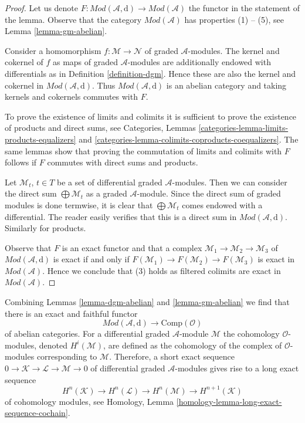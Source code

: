 \begin{proof}
Let us denote
$F : \textit{Mod}(\mathcal{A}, \text{d}) \to \textit{Mod}(\mathcal{A})$
the functor in the statement of the lemma. Observe that
the category $\textit{Mod}(\mathcal{A})$ has properties (1) -- (5), see
Lemma \ref{lemma-gm-abelian}.

\medskip\noindent
Consider a homomorphism $f : \mathcal{M} \to \mathcal{N}$
of graded $\mathcal{A}$-modules. The kernel
and cokernel of $f$ as maps of graded $\mathcal{A}$-modules
are additionally endowed with differentials as in
Definition \ref{definition-dgm}. Hence these are also
the kernel and cokernel in $\textit{Mod}(\mathcal{A}, \text{d})$.
Thus $\textit{Mod}(\mathcal{A}, \text{d})$ is an abelian category
and taking kernels and cokernels commutes with $F$.

\medskip\noindent
To prove the existence of limits and colimits it is sufficient
to prove the existence of products and direct sums, see
Categories, Lemmas \ref{categories-lemma-limits-products-equalizers} and
\ref{categories-lemma-colimits-coproducts-coequalizers}.
The same lemmas show that
proving the commutation of limits and colimits with $F$
follows if $F$ commutes with direct sums and products.

\medskip\noindent
Let $\mathcal{M}_t$, $t \in T$ be a set of differential
graded $\mathcal{A}$-modules. Then we can consider the direct
sum $\bigoplus \mathcal{M}_t$ as a graded $\mathcal{A}$-module.
Since the direct sum of graded modules is done termwise, it is
clear that $\bigoplus \mathcal{M}_t$ comes endowed with a differential.
The reader easily verifies that this is a direct sum in
$\textit{Mod}(\mathcal{A}, \text{d})$. Similarly for products.

\medskip\noindent
Observe that $F$ is an exact functor and that
a complex $\mathcal{M}_1 \to \mathcal{M}_2 \to \mathcal{M}_3$
of $\textit{Mod}(\mathcal{A}, \text{d})$ is exact if and only if
$F(\mathcal{M}_1) \to F(\mathcal{M}_2) \to F(\mathcal{M}_3)$
is exact in $\textit{Mod}(\mathcal{A})$. Hence we conclude that (3)
holds as filtered colimits are exact in
$\textit{Mod}(\mathcal{A})$.
\end{proof}

\noindent
Combining Lemmas \ref{lemma-dgm-abelian} and \ref{lemma-gm-abelian}
we find that there is an exact and faithful functor
$$
\textit{Mod}(\mathcal{A}, \text{d}) \longrightarrow \text{Comp}(\mathcal{O})
$$
of abelian categories. For a differential graded $\mathcal{A}$-module
$\mathcal{M}$ the cohomology $\mathcal{O}$-modules, denoted $H^i(\mathcal{M})$,
are defined as the cohomology of the complex of
$\mathcal{O}$-modules corresponding to $\mathcal{M}$.
Therefore, a short exact sequence 
$0 \to \mathcal{K} \to \mathcal{L} \to \mathcal{M} \to 0$
of differential graded $\mathcal{A}$-modules
gives rise to a long exact sequence
\begin{equation}
\label{equation-les}
H^n(\mathcal{K}) \to H^n(\mathcal{L}) \to H^n(\mathcal{M}) \to
H^{n + 1}(\mathcal{K})
\end{equation}
of cohomology modules, see
Homology, Lemma \ref{homology-lemma-long-exact-sequence-cochain}.

